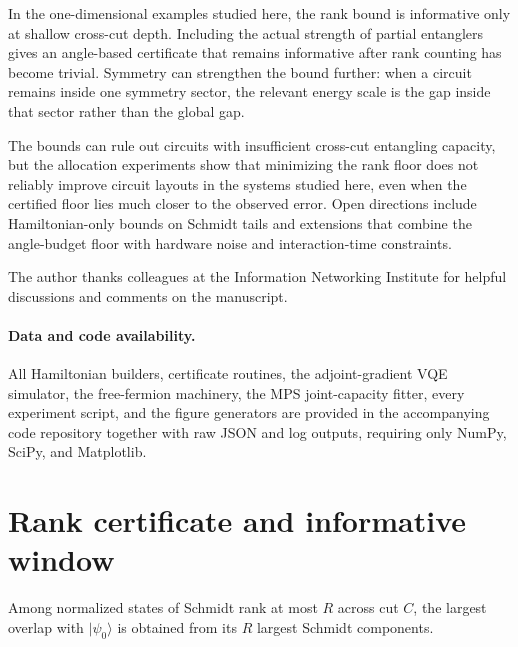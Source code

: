 \documentclass[reprint,aps,pra,floatfix,superscriptaddress,nofootinbib,longbibliography]{revtex4-2}
\theoremstyle{remark}
\theoremstyle{definition}
\newcommand{\ket}[1]{\lvert #1 \rangle}
\begin{document}
In the one-dimensional examples studied here, the rank bound is informative only
at shallow cross-cut depth. Including the actual strength of partial entanglers
gives an angle-based certificate that remains informative after rank counting
has become trivial. Symmetry can strengthen the bound further: when a circuit
remains inside one symmetry sector, the relevant energy scale is the gap inside
that sector rather than the global gap.

The bounds can rule out circuits with insufficient cross-cut entangling capacity, but the allocation
experiments show that minimizing the rank floor does not reliably improve
circuit layouts in the systems studied here, even when the certified floor lies
much closer to the observed error. Open directions include Hamiltonian-only
bounds on Schmidt tails and extensions that combine the angle-budget floor with
hardware noise and interaction-time constraints.

\begin{acknowledgments}
The author thanks colleagues at the Information Networking Institute for helpful
discussions and comments on the manuscript.
\end{acknowledgments}

\paragraph*{Data and code availability.}
All Hamiltonian builders, certificate routines, the adjoint-gradient VQE
simulator, the free-fermion machinery, the MPS joint-capacity fitter, every
experiment script, and the figure generators are provided in the accompanying
code repository together with raw JSON and log outputs, requiring only NumPy,
SciPy, and Matplotlib.

\appendix
\onecolumngrid

\section{Rank certificate and informative window}
\label{app:rank}
\label{app:fidelity}

Among normalized states of Schmidt rank at most $R$ across cut $C$, the largest
overlap with $\ket{\psi_0}$ is obtained from its $R$ largest Schmidt components.
\end{document}
